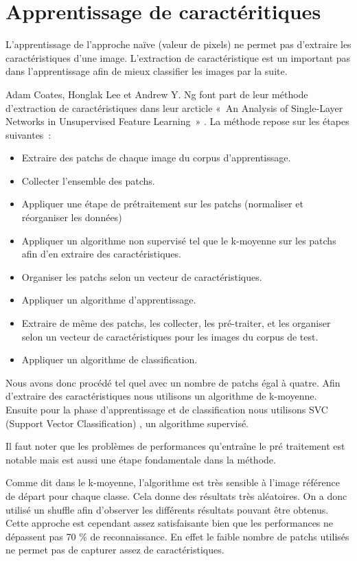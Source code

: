 \chapter{Apprentissage de caractéritiques}

L'apprentissage de l'approche naïve (valeur de pixels) ne permet pas d'extraire les caractéristiques d'une image. L'extraction de caractéristique est un important pas dans l'apprentissage afin de mieux classifier les images par la suite.

Adam Coates, Honglak Lee et Andrew Y. Ng font part de leur méthode d'extraction de caractéristiques dans leur arcticle « An Analysis of Single-Layer Networks in Unsupervised Feature Learning » \cite{coates2011analysis}. La méthode repose sur les étapes suivantes :

\begin{itemize}

\item Extraire des patchs de chaque image du corpus d'apprentissage.
	\item Collecter l'ensemble des patchs.
\item Appliquer une étape de prétraitement sur les patchs (normaliser et réorganiser les données)
	\item Appliquer un algorithme non supervisé tel que le k-moyenne sur les patchs afin d'en extraire des caractéristiques.
	\item Organiser les patchs selon un vecteur de caractéristiques.
	\item Appliquer un algorithme d'apprentissage.
	\item Extraire de même des patchs, les collecter, les pré-traiter, et les organiser selon un vecteur de caractéristiques pour les images du corpus de test.
	\item Appliquer un algorithme de classification.

	\end{itemize}

	Nous avons donc procédé tel quel avec un nombre de patchs égal à quatre. Afin d'extraire des caractéristiques nous utilisons un algorithme de k-moyenne. Ensuite pour la phase d'apprentissage et de classification nous utilisons SVC (Support Vector Classification) , un algorithme supervisé.

	Il faut noter que les problèmes de performances qu’entraîne le pré traitement est notable mais est aussi une étape fondamentale dans la méthode.

	Comme dit dans le k-moyenne, l'algorithme est très sensible à l'image référence de départ pour chaque classe. Cela donne des résultats très aléatoires. On a donc utilisé un shuffle afin d'observer les différents résultats pouvant être obtenus.
	Cette approche est cependant assez satisfaisante bien que les performances ne dépassent pas 70 \% de reconnaissance. En effet le faible nombre de patchs utilisés ne permet pas de capturer assez de caractéristiques.
